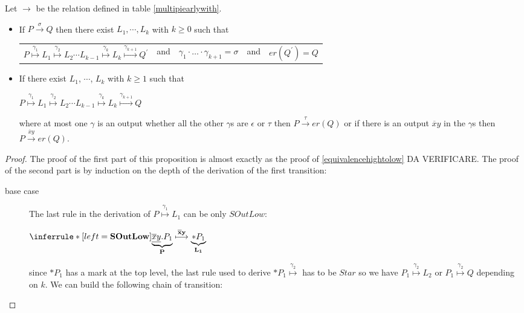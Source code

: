 \begin{proposition}
  Let $\rightarrow$ be the relation defined in table \ref{multipiearlywith}.
  \begin{itemize}
    \item
      If $P\xrightarrow{\sigma} Q$ then there exist $L_{1}, \cdots, L_{k}$ with $k\geq 0$ such that 
      \begin{center}
	\begin{tabular}{lllll}
	  $P 
	    \stackrel{\gamma_{1}}{\longmapsto} 
	      L_{1}  
		\stackrel{\gamma_{2}}{\longmapsto} 
		  L_{2} 
		    \cdots 
		      L_{k-1} 
			\stackrel{\gamma_{k}}{\longmapsto} 
			  L_{k} 
			    \stackrel{\gamma_{k+1}}{\longmapsto} 
			      Q^{'}$ 
	&
	  and
	&
	  $\gamma_{1} \cdot \ldots \cdot \gamma_{k+1} =  \sigma$  
	&
	  and
	&
	  $er(Q^{'})=Q$
	\end{tabular}
      \end{center}
    \item 
      If there exist $L_{1}$, $\cdots$, $L_{k}$ with $k\geq 1$ such that
      \begin{center}
	  $P 
	    \stackrel{\gamma_{1}}{\longmapsto} 
	      L_{1}  
		\stackrel{\gamma_{2}}{\longmapsto} 
		  L_{2} 
		    \cdots 
		      L_{k-1} 
			\stackrel{\gamma_{k}}{\longmapsto} 
			  L_{k} 
			    \stackrel{\gamma_{k+1}}{\longmapsto} 
			      Q$ 
      \end{center}
      where at most one $\gamma$ is an output whether all the other $\gamma$s are $\epsilon$ or $\tau$ then $P\xrightarrow{\tau} er(Q)$ or if there is an output $\overline{x}y$ in the $\gamma$s then $P\xrightarrow{\overline{x}y} er(Q)$. 
  \end{itemize}
  \begin{proof}
    The proof of the first part of this proposition is almost exactly as the proof of \ref{equivalencehightolow} DA VERIFICARE. The proof of the second part is by induction on the depth of the derivation of the first transition:
    \begin{description}
      \item[base case]
 	The last rule in the derivation of $P \stackrel{\gamma_{1}}{\longmapsto} L_{1}$ can be only $SOutLow$:
	    \begin{center}
 		  $\inferrule* [left=\bf{SOutLow}]{
 		    }{
 		      \underbrace{\underline{\overline{x}y}.P_{1}}_{P} \stackrel{\overline{x}y}{\longmapsto} \underbrace{* P_{1}}_{L_{1}}
 		  }$ 
	    \end{center}
	    since $*P_{1}$ has a mark at the top level, the last rule used to derive $*P_{1}\stackrel{\gamma_{2}}{\longmapsto}$ has to be $Star$ so we have $P_{1}\stackrel{\gamma_{2}}{\longmapsto}L_{2}$ or $P_{1}\stackrel{\gamma_{2}}{\longmapsto}Q$ depending on $k$. We can build the following chain of transition:

\end{description}
\end{proof}
\end{proposition}

